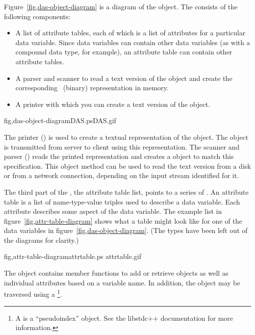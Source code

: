 Figure~\ref{fig,das-object-diagram} is a diagram of the 
object. The  consists of the following components:

\begin{itemize}

\item A list of attribute tables, each of which is a list of
  attributes for a particular data variable.  Since data variables can
  contain other data variables (as with a compound data type, for
  example), an attribute table can contain other attribute tables.

\item A parser and scanner to read a text version of the
   object and create the corresponding \Cpp\ (binary)
  representation in memory.

\item A printer with which you can create a text version of the
   object.

\end{itemize}

{fig,das-object-diagram}{DAS.ps}{DAS.gif}{}

The  printer () is used to create a
textual representation of the \Cpp object.  The object is transmitted
from server to client using this representation.  The scanner and
parser () reads the printed representation and
creates a \Cpp object to match this specification.  This object method
can be used to read the text version from a disk or from a network
connection, depending on the input stream identified for it.

The third part of the , the attribute table list, points to
a series of .  An attribute table is a list of
name-type-value triples used to describe a data variable.  Each
attribute describes some aspect of the data variable.  The example
list in figure~\ref{fig,attr-table-diagram} shows what a table might
look like for one of the data variables in
figure~\ref{fig,das-object-diagram}. (The types have been left out of
the diagrams for clarity.)

%
{fig,attr-table-diagram}{attrtable.ps}%
{attrtable.gif}{}

The  object contains member functions to add or retrieve
 objects as well as individual attributes based on a
variable name. In addition, the  object may be
traversed using a \footnote{A  is a %
``pseudoindex'' object. See the libstdc++ documentation for more
information.}.

